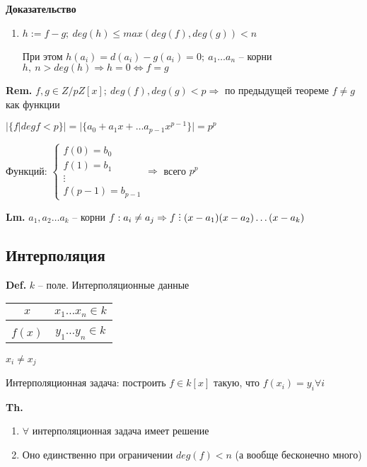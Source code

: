 \documentclass[14pt, letter paper]{article}
\def\divby{%
  \mathrel{\text{\vbox{\baselineskip.65ex\lineskiplimit0pt\hbox{.}\hbox{.}\hbox{.}}}}%
}
\begin{document}
\begin{center}
    \textbf{Доказательство}
\end{center}

\begin{enumerate}
    \item $h := f - g;\ deg(h) \leq max(deg(f), deg(g)) < n$

    При этом $h(a_i) = d(a_i) - g(a_i) = 0;\ a_1 \ldots a_n$ -- корни $h,\ n > deg(h) \Rightarrow h = 0 \Leftrightarrow f = g$
\end{enumerate}

\textbf{Rem.} $f, g \in Z/pZ[x];\ deg(f), deg(g) < p \Rightarrow$ по предыдущей теореме $f \neq g$ как функции

$|\{f | deg{f} < p\}| = |\{a_0 + a_1x + \ldots a_{p-1}x^{p-1}\}| = p^p$

Функций: $\begin{cases}
    f(0) = b_0 \\
    f(1) = b_1 \\
    \vdots \\
    f(p-1) = b_{p-1}
\end{cases} \Rightarrow$ всего $p^p$

\textbf{Lm.} $a_1, a_2 \ldots a_k$ -- корни $f : a_i \neq a_j \Rightarrow f \divby (x-a_1)(x-a_2)\ldots(x-a_k)$

\begin{center}
    \section*{Интерполяция}
\end{center}

\textbf{Def.} $k$ -- поле. Интерполяционные данные \begin{tabular}{c|c}
    $x$ & $x_1 \ldots x_n \in k$ \\
    \hline \\
    $f(x)$ & $y_1 \ldots y_n \in k$
\end{tabular} $x_i \neq x_j$

Интерполяционная задача: построить $f \in k[x]$ такую, что $f(x_i) = y_i \forall i$

\vspace{3mm}

\textbf{Th.} \begin{enumerate}
    \item $\forall$ интерполяционная задача имеет решение

    \item Оно единственно при ограничении $deg(f) < n$ (а вообще бесконечно много)
\end{enumerate}
\end{document}
